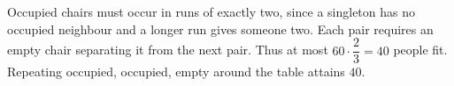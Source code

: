 Occupied chairs must occur in runs of exactly two, since a singleton has no occupied neighbour and a longer run gives someone two. Each pair requires an empty chair separating it from the next pair. Thus at most $60\cdot\dfrac{2}{3}=40$ people fit. Repeating occupied, occupied, empty around the table attains $\boxed{40}$.
